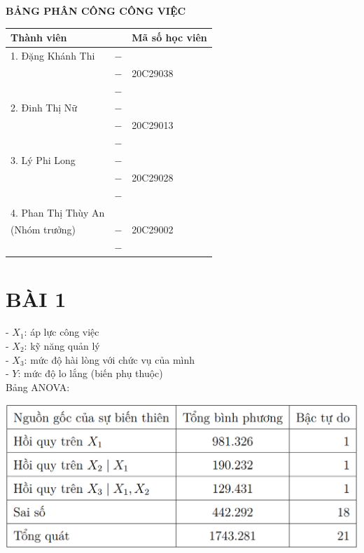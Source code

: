 \documentclass[a4paper]{article}
\theoremstyle{nonumberplain}
\begin{document}
\newpage
\thispagestyle{empty}
\begin{center}
\textbf{\large{BẢNG PHÂN CÔNG CÔNG VIỆC}\\}
\vspace{1cm}
\begin{tabular}{|m{4.5cm}||m{8cm}|m{3.5cm}|} 
\hline
\textbf{Thành viên} & \centering{\textbf{Công việc}} & \textbf{Mã số học viên}\\
\hline
1. Đặng Khánh Thi & $-$ & \\
& $-$  & \hspace{0.75cm}20C29038 \\
& $-$ & \\
\hline
2. Đinh Thị Nữ  & $-$ & \\
& $-$ & \hspace{0.75cm}20C29013\\
& $-$ & \\
\hline 
3. Lý Phi Long & $-$ & \\
& $-$ & \hspace{0.75cm}20C29028\\
& $-$ & \\
\hline
4. Phan Thị Thùy An & & \\
\hspace{1cm}(Nhóm trưởng) & $-$  & \hspace{0.75cm}20C29002 \\
& $-$  & \\
\hline
\end{tabular}
\end{center}

\newpage
\section*{BÀI 1}
- $X_1$: áp lực công việc\\
- $X_2$: kỹ năng quản lý\\
- $X_3$: mức độ hài lòng với chức vụ của mình\\
- $Y$: mức độ lo lắng (biến phụ thuộc)\\
Bảng ANOVA:
\begin{center}
\includegraphics[scale =0.5]{anova1.PNG} 
\end{center}
\end{document}
